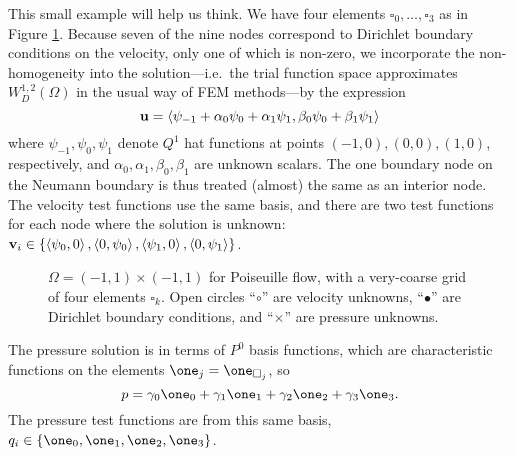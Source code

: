 This small example will help us think.  We have four elements $\square_0,\dots,\square_3$ as in Figure \ref{fig:ok:poiseuille}.  Because seven of the nine nodes correspond to Dirichlet boundary conditions on the velocity, only one of which is non-zero, we incorporate the non-homogeneity into the solution---i.e.~the trial function space approximates $W_D^{1,2}(\Omega)$ in the usual way of FEM methods---by the expression
\begin{equation}
\mathbf{u} = \left<\psi_{-1}+\alpha_0\psi_0+\alpha_1\psi_1,\beta_0\psi_0+\beta_1\psi_1\right>  \label{eq:ok:smallexpansionvelocity}
\end{equation}
where $\psi_{-1},\psi_0,\psi_1$ denote $Q^1$ hat functions at points $(-1,0),(0,0),(1,0)$, respectively, and $\alpha_0,\alpha_1,\beta_0,\beta_1$ are unknown scalars.  The one boundary node on the Neumann boundary is thus treated (almost) the same as an interior node.  The velocity test functions use the same basis, and there are two test functions for each node where the solution is unknown: $\mathbf{v}_i \in \left\{\left<\psi_0,0\right>, \left<0,\psi_0\right>, \left<\psi_1,0\right>, \left<0,\psi_1\right>\right\}$.

\begin{figure}

\caption{$\Omega=(-1,1)\times(-1,1)$ for Poiseuille flow, with a very-coarse grid of four elements $\square_k$.  Open circles ``{\large $\circ$}'' are velocity unknowns, ``$\bullet$'' are Dirichlet boundary conditions, and ``$\times$'' are pressure unknowns.}
\label{fig:ok:poiseuille}
\end{figure}

The pressure solution is in terms of $P^0$ basis functions, which are characteristic functions on the elements $\one_j = \one_{\square_j}$, so
\begin{equation}
p = \gamma_0 \one_0 + \gamma_1 \one_1 + \gamma_2 \one_2 + \gamma_3 \one_3.  \label{eq:ok:smallexpansionpressure}
\end{equation}
The pressure test functions are from this same basis, $q_i \in \{\one_0,\one_1,\one_2,\one_3\}$.

